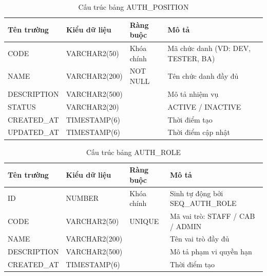 \documentclass[../DoAn.tex]{subfiles}
\begin{document}
\begin{table}[H]
\centering
\caption{Cấu trúc bảng AUTH\_POSITION}
\label{tab:auth-position}
\footnotesize
\begin{tabular}{|p{3.0cm}|p{2.3cm}|p{2.7cm}|p{4.5cm}|}
\hline
\textbf{Tên trường} & \textbf{Kiểu dữ liệu} & \textbf{Ràng buộc} & \textbf{Mô tả} \\ \hline
CODE & VARCHAR2(50) & Khóa chính & Mã chức danh (VD: DEV, TESTER, BA) \\ \hline
NAME & VARCHAR2(200) & NOT NULL & Tên chức danh đầy đủ \\ \hline
DESCRIPTION & VARCHAR2(500) & & Mô tả nhiệm vụ \\ \hline
STATUS & VARCHAR2(20) & & ACTIVE / INACTIVE \\ \hline
CREATED\_AT & TIMESTAMP(6) & & Thời điểm tạo \\ \hline
UPDATED\_AT & TIMESTAMP(6) & & Thời điểm cập nhật \\ \hline
\end{tabular}
\end{table}

\begin{table}[H]
\centering
\caption{Cấu trúc bảng AUTH\_ROLE}
\label{tab:auth-role}
\footnotesize
\begin{tabular}{|p{3.0cm}|p{2.3cm}|p{2.7cm}|p{4.5cm}|}
\hline
\textbf{Tên trường} & \textbf{Kiểu dữ liệu} & \textbf{Ràng buộc} & \textbf{Mô tả} \\ \hline
ID & NUMBER & Khóa chính & Sinh tự động bởi SEQ\_AUTH\_ROLE \\ \hline
CODE & VARCHAR2(50) & UNIQUE & Mã vai trò: STAFF / CAB / ADMIN \\ \hline
NAME & VARCHAR2(200) & & Tên vai trò đầy đủ \\ \hline
DESCRIPTION & VARCHAR2(500) & & Mô tả phạm vi quyền hạn \\ \hline
CREATED\_AT & TIMESTAMP(6) & & Thời điểm tạo \\ \hline
\end{tabular}
\end{table}
\end{document}
